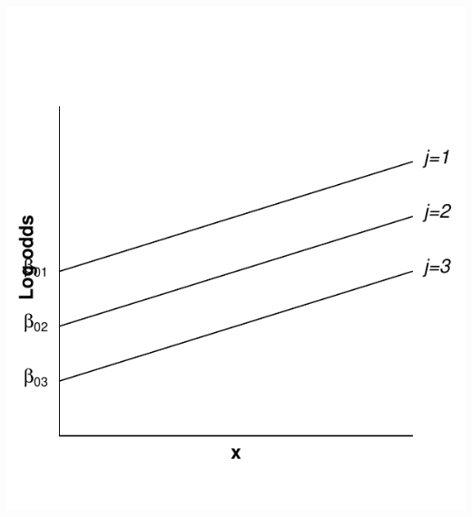 \documentclass[
  letterpaper,
  DIV=11,
  numbers=noendperiod]{scrartcl}
\begin{document}
\begin{center}
\includegraphics{about_files/figure-pdf/unnamed-chunk-2-1.pdf}
\end{center}
\end{document}
